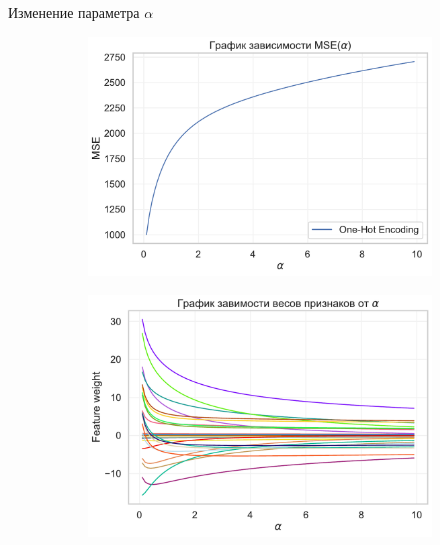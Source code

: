 \documentclass{beamer} %
\begin{document}
    \begin{frame}{Изменение параметра $\alpha$}
        \begin{figure}
            \centering
            \begin{subfigure}[b]{0.475\textwidth}
                \centering
                \includegraphics[width=\textwidth]{MSE_plot_oh.pdf}
            \end{subfigure}
            \hfill
            \begin{subfigure}[b]{0.475\textwidth}  
                \centering 
                \includegraphics[width=\textwidth]{feature_plot_oh.pdf}
            \end{subfigure}
            \begin{subfigure}[b]{0.475\textwidth}   
                \centering 

\end{subfigure}
\end{figure}
\end{frame}
\end{document}
